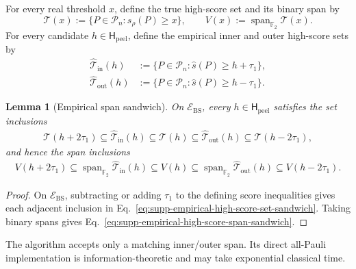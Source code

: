 \documentclass[
  aps,
  prx,
  reprint,
  superscriptaddress,
  amsmath,
  amssymb,
  nofootinbib,
  longbibliography
]{revtex4-2}
\newtheorem{lemma}[theorem]{Lemma}
\newcommand{\Span}{\operatorname{span}}
\newcommand{\Pc}{\mathcal{P}}
\newcommand{\Fc}{\mathbb{F}_2}
\begin{document}
For every real threshold $x$, define the true high-score set and its binary
span by
\begin{equation}
\mathcal T(x)
:=
\{P\in\Pc_n:s_\rho(P)\ge x\},
\qquad
V(x)
:=
\Span_{\Fc}\mathcal T(x).
\label{eq:supp-true-high-score-span}
\end{equation}
For every candidate $h\in\mathsf H_{\mathrm{peel}}$, define the empirical inner and outer
high-score sets by
\begin{equation}
\begin{aligned}
\widehat{\mathcal T}_{\mathrm{in}}(h)
&:=
\bigl\{
P\in\Pc_n:\hat s(P)\ge h+\tau_1
\bigr\},
\\
\widehat{\mathcal T}_{\mathrm{out}}(h)
&:=
\bigl\{
P\in\Pc_n:\hat s(P)\ge h-\tau_1
\bigr\}.
\end{aligned}
\label{eq:supp-empirical-inner-outer-sets}
\end{equation}
\begin{lemma}[Empirical span sandwich]
\label{lem:supp-empirical-span-sandwich}
On $\mathcal E_{\mathrm{BS}}$, every $h\in\mathsf H_{\mathrm{peel}}$ satisfies the set
inclusions
\begin{equation}
\begin{aligned}
\mathcal T(h+2\tau_1)
\subseteq
\widehat{\mathcal T}_{\mathrm{in}}(h)
\subseteq
\mathcal T(h)
\subseteq
\widehat{\mathcal T}_{\mathrm{out}}(h)
\subseteq
\mathcal T(h-2\tau_1),
\end{aligned}
\label{eq:supp-empirical-high-score-set-sandwich}
\end{equation}
and hence the span inclusions
\begin{equation}
\begin{aligned}
V(h+2\tau_1)
\subseteq
\Span_{\Fc}\widehat{\mathcal T}_{\mathrm{in}}(h)
\subseteq
V(h)
\subseteq
\Span_{\Fc}\widehat{\mathcal T}_{\mathrm{out}}(h)
\subseteq
V(h-2\tau_1).
\end{aligned}
\label{eq:supp-empirical-high-score-span-sandwich}
\end{equation}
\end{lemma}

\begin{proof}
On $\mathcal E_{\mathrm{BS}}$, subtracting or adding $\tau_1$ to the
defining score inequalities gives each adjacent inclusion in
Eq.~\eqref{eq:supp-empirical-high-score-set-sandwich}.  Taking binary spans
gives Eq.~\eqref{eq:supp-empirical-high-score-span-sandwich}.
\end{proof}

The algorithm accepts only a matching inner/outer span.  Its direct
all-Pauli implementation is information-theoretic and may take exponential
classical time.
\end{document}
